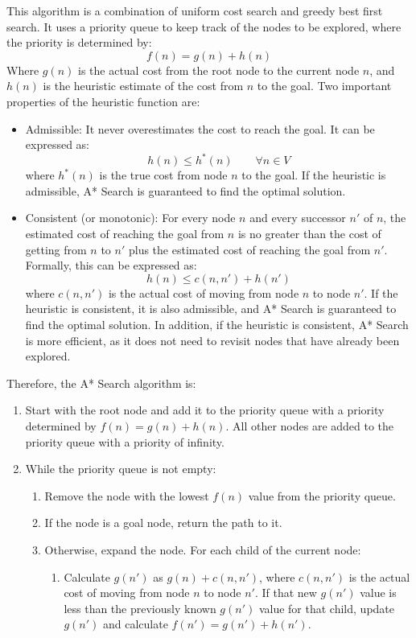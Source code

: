 This algorithm is a combination of uniform cost search and greedy best first search. It uses a priority queue to keep track of the nodes to be explored, where the priority is determined by:
\begin{equation*}
    f(n) = g(n) + h(n)
\end{equation*}
Where $g(n)$ is the actual cost from the root node to the current node $n$, and $h(n)$ is the heuristic estimate of the cost from $n$ to the goal. Two important properties of the heuristic function are:
\begin{itemize}
    \item Admissible: It never overestimates the cost to reach the goal. It can be expressed as:
    \begin{equation*}        h(n) \leq h^*(n)\qquad \forall n\in V
    \end{equation*}
    where $h^*(n)$ is the true cost from node $n$ to the goal. If the heuristic is admissible, A* Search is guaranteed to find the optimal solution.
    \item Consistent (or monotonic): For every node $n$ and every successor $n'$ of $n$, the estimated cost of reaching the goal from $n$ is no greater than the cost of getting from $n$ to $n'$ plus the estimated cost of reaching the goal from $n'$. Formally, this can be expressed as:
    \begin{equation*}
        h(n) \leq c(n, n') + h(n')
    \end{equation*}
    where $c(n, n')$ is the actual cost of moving from node $n$ to node $n'$. If the heuristic is consistent, it is also admissible, and A* Search is guaranteed to find the optimal solution. In addition, if the heuristic is consistent, A* Search is more efficient, as it does not need to revisit nodes that have already been explored.
\end{itemize}

Therefore, the A* Search algorithm is:
\begin{enumerate}
    \item Start with the root node and add it to the priority queue with a priority determined by $f(n) = g(n) + h(n)$. All other nodes are added to the priority queue with a priority of infinity.
    \item While the priority queue is not empty:
    \begin{enumerate}
        \item Remove the node with the lowest $f(n)$ value from the priority queue.
        \item If the node is a goal node, return the path to it.
        \item Otherwise, expand the node. For each child of the current node:
        \begin{enumerate}
            \item Calculate $g(n')$ as $g(n) + c(n, n')$, where $c(n, n')$ is the actual cost of moving from node $n$ to node $n'$. If that new $g(n')$ value is less than the previously known $g(n')$ value for that child, update $g(n')$ and calculate $f(n') = g(n') + h(n')$.
        \end{enumerate}
    \end{enumerate}
\end{enumerate}


